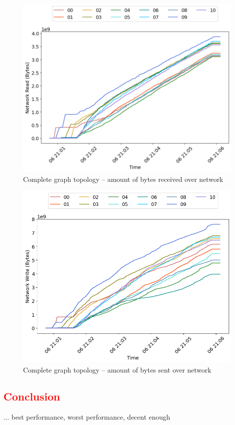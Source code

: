 \begin{minipage}{0.5\linewidth}
\begin{figure}[H]
\captionsetup{justification=centering,width=0.8\linewidth}
\includegraphics[width=\linewidth]{figures/graph-complete/net_read.png}
\caption{Complete graph topology -- amount of bytes received over network}
\label{fig:graph-complete-cpu_usage}
\end{figure}
\end{minipage}
\begin{minipage}{0.5\linewidth}
\begin{figure}[H]
\captionsetup{justification=centering,width=0.8\linewidth}
\includegraphics[width=\linewidth]{figures/graph-complete/net_write.png}
\caption{Complete graph topology -- amount of bytes sent over network}
\label{fig:graph-complete-mem_usage}
\end{figure}
\end{minipage}


\subsection{\textcolor{red}{Conclusion}}
...
best performance, worst performance, decent enough



